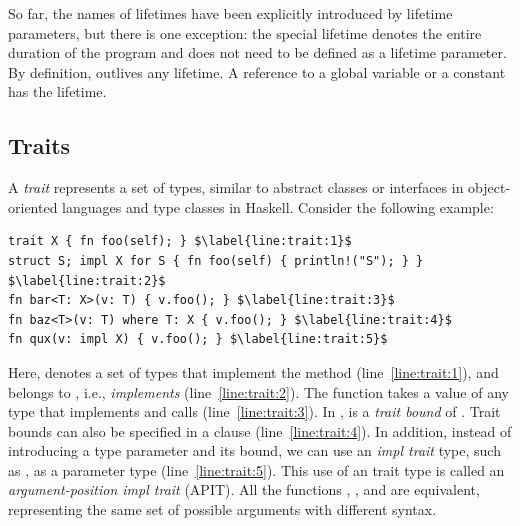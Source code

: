 So far, the names of lifetimes have been explicitly introduced by lifetime
parameters, but there is one exception:
%
the special lifetime  denotes the entire duration of the program and
does not need to be defined as a lifetime parameter.
%
By definition,  outlives any lifetime.
%
A reference to a global variable or a constant has the  lifetime.


\subsection{Traits}
\label{sec:background:trait}

A \emph{trait} represents a set of types, similar to abstract classes or
interfaces in object-oriented languages and type classes in Haskell.
%
Consider the following example:

\vspace{-0.5em}
\begin{lstlisting}[basicstyle=\linespread{0.85}\ttfamily\footnotesize,]
trait X { fn foo(self); } $\label{line:trait:1}$
struct S; impl X for S { fn foo(self) { println!("S"); } } $\label{line:trait:2}$
fn bar<T: X>(v: T) { v.foo(); } $\label{line:trait:3}$
fn baz<T>(v: T) where T: X { v.foo(); } $\label{line:trait:4}$
fn qux(v: impl X) { v.foo(); } $\label{line:trait:5}$
\end{lstlisting}
\vspace{-0.5em}

\noindent
%
Here,  denotes a set of types that implement the method 
(line~\ref{line:trait:1}), and  belongs to , i.e., 
\emph{implements}  (line~\ref{line:trait:2}).
%
The function  takes a value of any type  that implements  and
calls  (line~\ref{line:trait:3}).
%
In ,  is a \emph{trait bound} of .
%
Trait bounds can also be specified in a  clause
(line~\ref{line:trait:4}).
%
In addition, instead of introducing a type parameter and its bound, we can use
an \emph{impl trait} type, such as , as a parameter type
(line~\ref{line:trait:5}).
%
This use of an  trait type is called an \emph{argument-position impl
trait} (APIT).
%
All the functions , , and  are equivalent, representing the
same set of possible arguments with different syntax.
%

